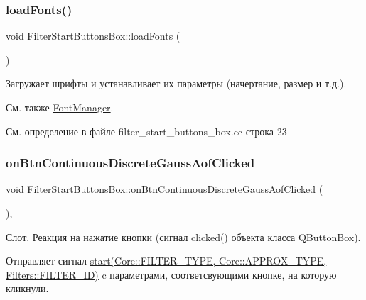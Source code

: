 \subsubsection{\texorpdfstring{load\+Fonts()}{loadFonts()}}
{\footnotesize\ttfamily void Filter\+Start\+Buttons\+Box\+::load\+Fonts (\begin{DoxyParamCaption}{ }\end{DoxyParamCaption})\hspace{0.3cm}{\ttfamily [private]}}



Загружает шрифты и устанавливает их параметры (начертание, размер и т.\+д.). 

\begin{DoxySeeAlso}{См. также}
\hyperlink{class_font_manager}{Font\+Manager}. 
\end{DoxySeeAlso}


См. определение в файле filter\+\_\+start\+\_\+buttons\+\_\+box.\+cc строка 23

\hypertarget{class_filter_start_buttons_box_ae7a3648f3c75d184a32cb42e7e1f4d84}{}\label{class_filter_start_buttons_box_ae7a3648f3c75d184a32cb42e7e1f4d84} 
\subsubsection{\texorpdfstring{on\+Btn\+Continuous\+Discrete\+Gauss\+Aof\+Clicked}{onBtnContinuousDiscreteGaussAofClicked}}
{\footnotesize\ttfamily void Filter\+Start\+Buttons\+Box\+::on\+Btn\+Continuous\+Discrete\+Gauss\+Aof\+Clicked (\begin{DoxyParamCaption}{ }\end{DoxyParamCaption})\hspace{0.3cm}{\ttfamily [private]}, {\ttfamily [slot]}}

Слот. Реакция на нажатие кнопки (сигнал clicked() объекта класса Q\+Button\+Box).

Отправляет сигнал \hyperlink{class_filter_start_buttons_box_ac6e2a6555f1d388391f188f834b8e753}{start(\+Core\+::\+F\+I\+L\+T\+E\+R\+\_\+\+T\+Y\+P\+E, Core\+::\+A\+P\+P\+R\+O\+X\+\_\+\+T\+Y\+P\+E, Filters\+::\+F\+I\+L\+T\+E\+R\+\_\+\+I\+D)} c параметрами, соответсвующими кнопке, на которую кликнули. 

